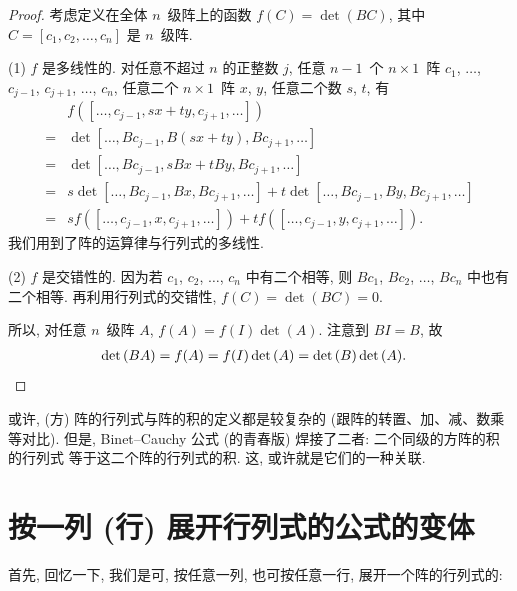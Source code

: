 \documentclass[%
    UTF8,%
    fontset=none,%
    punct=kaiming,%
    zihao=-4,%
    a4paper,%
    oneside,%
]{ctexbook}
\begin{document}
\begin{proof}
    考虑定义在全体 \(n\)~级阵上的函数
    \(f(C) = \det {(BC)}\),
    其中 \(C = [c_1, c_2, \dots, c_n]\) 是 \(n\)~级阵.

    (1)
    \(f\) 是多线性的.
    对任意不超过 \(n\) 的正整数 \(j\),
    任意 \(n-1\)~个 \(n \times 1\)~阵
    \(c_1\), \(\dots\), \(c_{j-1}\),
    \(c_{j+1}\), \(\dots\), \(c_n\),
    任意二个 \(n \times 1\)~阵 \(x\), \(y\),
    任意二个数 \(s\), \(t\),
    有
    \begin{align*}
             &
        f([\dots, c_{j-1}, sx + ty, c_{j+1}, \dots])
        \\
        = {} &
        \det {[\dots, Bc_{j-1}, B(sx + ty), Bc_{j+1}, \dots]}
        \\
        = {} &
        \det {[\dots, Bc_{j-1}, sBx + tBy, Bc_{j+1}, \dots]}
        \\
        = {} &
        s\det {[\dots, Bc_{j-1}, Bx, Bc_{j+1}, \dots]}
        +
        t\det {[\dots, Bc_{j-1}, By, Bc_{j+1}, \dots]}
        \\
        = {} &
        s f([\dots, c_{j-1}, x, c_{j+1}, \dots])
        +
        t f([\dots, c_{j-1}, y, c_{j+1}, \dots]).
    \end{align*}
    我们用到了阵的运算律与行列式的多线性.

    (2)
    \(f\) 是交错性的.
    因为若 \(c_1\), \(c_2\), \(\dots\), \(c_n\) 中有二个相等,
    则 \(Bc_1\), \(Bc_2\), \(\dots\), \(Bc_n\) 中也有二个相等.
    再利用行列式的交错性,
    \(f(C) = \det {(BC)} = 0\).

    所以, 对任意 \(n\)~级阵 \(A\),
    \(f(A) = f(I) \det {(A)}\).
    注意到 \(BI = B\),
    故
    \begin{align*}
         &
        \det {(BA)} = f(A) = f(I) \det {(A)}
        = \det {(B)} \det {(A)}.
        \qedhere
    \end{align*}
\end{proof}

或许, (方) 阵的行列式与阵的积的定义都是较复杂的
(跟阵的转置、加、减、数乘等对比).
但是, Binet--Cauchy 公式 (的青春版)
焊接了二者:
二个同级的方阵的积的行列式%
等于这二个阵的行列式的积.
这, 或许就是它们的一种关联.

\section{按一列 (行) 展开行列式的公式的变体}

首先, 回忆一下,
我们是可,
按任意一列, 也可按任意一行,
展开一个阵的行列式的:
\end{document}
